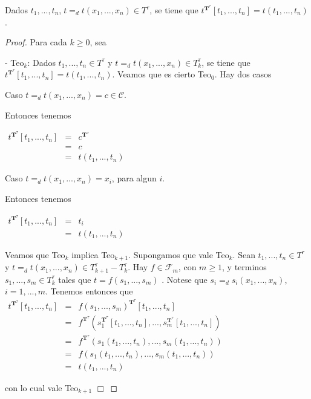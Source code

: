 
  \begin{lemma}
    Dados \(t_{1},...,t_{n}\),\(\;t=_{d}t(x_{1},...,x_{n})\in T^{\tau }\), se tiene que \(t^{\mathbf{T}^{\tau }}[t_{1},...,t_{n}]=t(t_{1},...,t_{n})\).
  \end{lemma}
  \begin{proof}
    Para cada \(k\geq 0\), sea

    - Teo\(_{k}\): Dados \(t_{1},...,t_{n}\in T^{\tau }\) y \( t=_{d}t(x_{1},...,x_{n})\in T_{k}^{\tau }\), se tiene que \(t^{\mathbf{T} ^{\tau }}[t_{1},...,t_{n}]=t(t_{1},...,t_{n})\).
    Veamos que es cierto Teo\(_{0}\). Hay dos casos

    Caso \(t=_{d}t(x_{1},...,x_{n})=c\in \mathcal{C}\).

    Entonces tenemos

    \(\displaystyle \begin{array}{cll} t^{\mathbf{T}^{\tau }}[t_{1},...,t_{n}] & = & c^{\mathbf{T}^{\tau }} \\ & = & c \\ & = & t(t_{1},...,t_{n}) \end{array} \)

    Caso \(t=_{d}t(x_{1},...,x_{n})=x_{i}\), para algun \(i\).

    Entonces tenemos

    \(\displaystyle \begin{array}{cll} t^{\mathbf{T}^{\tau }}[t_{1},...,t_{n}] & = & t_{i} \\ & = & t(t_{1},...,t_{n}) \end{array} \)

    Veamos que Teo\(_{k}\) implica Teo\(_{k+1}\). Supongamos que vale Teo\(_{k}\). Sean \(t_{1},...,t_{n}\in T^{\tau }\) y \(t=_{d}t(x_{1},...,x_{n})\in T_{k+1}^{\tau }-T_{k}^{\tau }\). Hay \(f\in \mathcal{F}_{m}\), con \(m\geq 1\), y terminos \(s_{1},...,s_{m}\in T_{k}^{\tau }\) tales que \(t=f(s_{1},...,s_{m})\) . Notese que \(s_{i}=_{d}s_{i}(x_{1},...,x_{n})\), \(i=1,...,m\). Tenemos entonces que
    \(\displaystyle \begin{array}{lll} t^{\mathbf{T}^{\tau }}[t_{1},...,t_{n}] & = & f(s_{1},...,s_{m})^{\mathbf{T} ^{\tau }}[t_{1},...,t_{n}] \\ & = & f^{\mathbf{T}^{\tau }}(s_{1}^{\mathbf{T}^{\tau }}[t_{1},...,t_{n}],...,s_{m}^{\mathbf{T}^{\tau }}[t_{1},...,t_{n}]) \\ & = & f^{\mathbf{T}^{\tau }}(s_{1}(t_{1},...,t_{n}),...,s_{m}(t_{1},...,t_{n})) \\ & = & f(s_{1}(t_{1},...,t_{n}),...,s_{m}(t_{1},...,t_{n})) \\ & = & t(t_{1},...,t_{n}) \end{array} \)

    con lo cual vale Teo\(_{k+1}\) \(\Box\)
  \end{proof}

